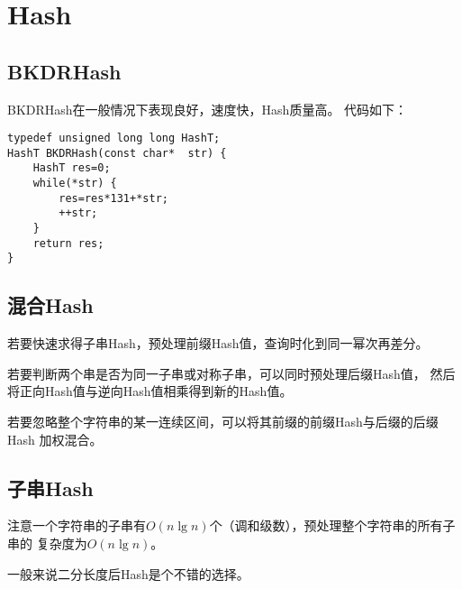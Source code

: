 \section{Hash}
\subsection{BKDRHash}
BKDRHash在一般情况下表现良好，速度快，Hash质量高。
代码如下：
\begin{lstlisting}
typedef unsigned long long HashT;
HashT BKDRHash(const char*  str) {
    HashT res=0;
    while(*str) {
        res=res*131+*str;
        ++str;
    }
    return res;
}
\end{lstlisting}
\subsection{混合Hash}
若要快速求得子串Hash，预处理前缀Hash值，查询时化到同一幂次再差分。

若要判断两个串是否为同一子串或对称子串，可以同时预处理后缀Hash值，
然后将正向Hash值与逆向Hash值相乘得到新的Hash值。

若要忽略整个字符串的某一连续区间，可以将其前缀的前缀Hash与后缀的后缀Hash
加权混合。
\subsection{子串Hash}
注意一个字符串的子串有$O(n\lg n)$个（调和级数），预处理整个字符串的所有子串的
复杂度为$O(n\lg n)$。

一般来说二分长度后Hash是个不错的选择。
